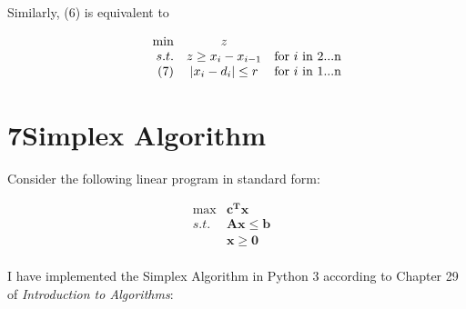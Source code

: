 \documentclass[a4paper,12pt]{article}
\begin{document}
Similarly, (6) is equivalent to

\[
\begin{array}{rcl}
\min & z\\
s.t. & z\geq x_i-x_{i-1} & $for $i$ in 2...n$  \\ \tag{7}
     & |x_i-d_i|\leq r & $for $i$ in 1...n$\\
\end{array} \nonumber
\]

\section*{7\quad Simplex Algorithm}

Consider the following linear program in standard form:

\[
\begin{array}{rrrrrrrrl}
 \max & \mathbf{c^T x }&   \\
 s.t. & \mathbf{A x \leq  b} &  \\ \tag{8}
      & \mathbf{x \geq 0} & \\
\end{array} \nonumber
\]

I have implemented the Simplex Algorithm in Python 3 according to Chapter 29 of \emph{Introduction to Algorithms}:
\end{document}
